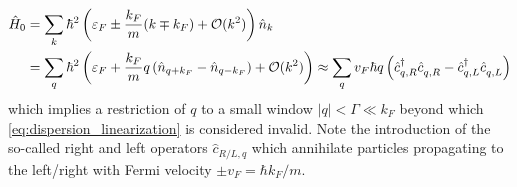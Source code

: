 \begin{align}
    \hat H_0
    &= \sum_k \hbar^2\brlr{\varepsilon_F \pm \frac{k_F}{m}(k\mp k_F) + \mathcal{O}(k^2)}\hat n_k
    \\
    &= \sum_q \hbar^2\brlr{\varepsilon_F + \frac{k_F}{m}q\brlr{\hat n_{q+k_F}-\hat n_{q-k_F}} + \mathcal{O}(k^2)}
    \approx \sum_{q} v_F \hbar q \brlr{\hat c^\dag_{q,R}\hat c^\pdag_{q,R} - \hat c^\dag_{q,L}\hat c^\pdag_{q,L}}
    \label{eq:dispersion_linearization}
\end{align}
which implies a restriction of $q$ to a small window $|q|<\Gamma\ll k_F$ beyond which \cref{eq:dispersion_linearization} is considered invalid.
Note the introduction of the so-called right and left operators $\hat c_{R/L,q}$ which annihilate particles propagating to the left/right with Fermi velocity $\pm v_F=\hbar k_F/m$.

